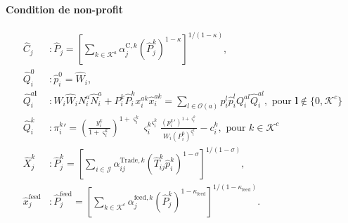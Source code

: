 \paragraph{Condition de non-profit}
\begin{align}
    \hat{C}_j                & : \hat{P}_j = \left[ \sum_{k \in \mathcal{K}^a} \alpha_j^{\text{C},k} \left(\hat{P}_j^k\right)^{1- \kappa} \right]^{1/(1 - \kappa)},                                                                                                 \\
    \hat{Q}_i^0              & :\hat{p}_i^0=\hat{W}_i,                                                                                                                                                                                                              \\
    \hat{Q}_i^{a \mathbf{l}} & : W_i \hat{W}_i N_i^a \hat{N}_i^a + P_i^k \hat{P}_i^k x_i^{ak} \hat{x}_i^{ak} = \sum_{l\in \mathcal{O}(a)} p_i^l \hat{p}_i^l Q_i^{al} \hat{Q}_i^{al}, \text{ pour } \mathbf{l} \notin \{0, \mathcal{K}^c\}                           \\
    \hat{Q}_i^k              & : {\pi_i^k} \prime = \left( \frac{y_i^k}{1+\varsigma_i^k} \right)^{1+\varsigma_i^k} {\varsigma_i^k}^{\varsigma_i^k} \frac{({p_i^k}\prime)^{1+ \varsigma_i^k}}{W_i (P_i^0)^{\varsigma_i^k}} - c_i^k, \text{ pour } k\in \mathcal{K}^c \\
    \hat{X}_j^k              & : \hat{P}_j^k = \left[ \sum_{i \in \mathcal{J}} \alpha_{ij}^{\text{Trade},k} \left(\hat{T}_{ij}^k \hat{p}_i^k\right)^{1 - \sigma} \right]^{1/(1 - \sigma)},                                                                          \\
    \hat{x}_j^{\text{feed}}  & : \hat{P}_j^{\text{feed}} = \left[ \sum_{k \in\mathcal{K}^c} \alpha_j^{\text{feed},k} \left(\hat{P}_j^k\right)^{1 - \kappa_\text{feed}} \right]^{1/(1 - \kappa_\text{feed})}.
\end{align}

